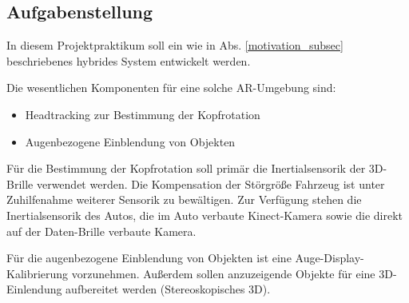 \subsection{Aufgabenstellung}
\label{aufgabenstellung_subsec}


In diesem Projektpraktikum soll ein wie in Abs. \ref{motivation_subsec} beschriebenes hybrides System entwickelt werden.

Die wesentlichen Komponenten für eine solche AR-Umgebung sind:
\begin{itemize}
  \item Headtracking zur Bestimmung der Kopfrotation
  \item Augenbezogene Einblendung von Objekten
\end{itemize}

Für die Bestimmung der Kopfrotation soll primär die Inertialsensorik der 3D-Brille verwendet werden.
Die Kompensation der Störgröße Fahrzeug ist unter Zuhilfenahme weiterer Sensorik zu bewältigen.
Zur Verfügung stehen die Inertialsensorik des Autos, die im Auto verbaute Kinect-Kamera sowie die direkt auf der Daten-Brille verbaute Kamera.

Für die augenbezogene Einblendung von Objekten ist eine Auge-Display-Kalibrierung vorzunehmen.
Außerdem sollen anzuzeigende Objekte für eine 3D-Einlendung aufbereitet werden (Stereoskopisches 3D).


